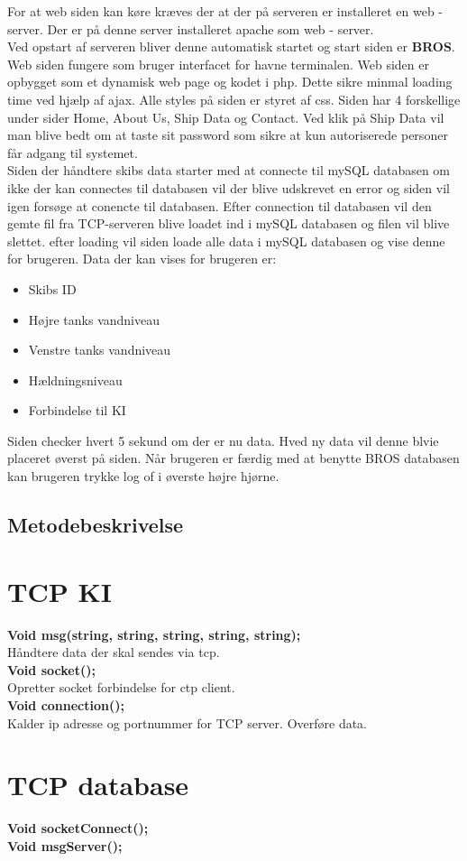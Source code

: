 For at web siden kan køre kræves der at der på serveren er installeret en web - server. Der er på denne server installeret apache som web - server.\\
Ved opstart af serveren bliver denne automatisk startet og start siden er \textbf{BROS}. Web siden fungere som bruger interfacet for havne terminalen. Web siden er opbygget som et dynamisk web page og kodet i php. Dette sikre minmal loading time ved hjælp af ajax. Alle styles på siden er styret af css. Siden har 4 forskellige under sider Home, About Us, Ship Data og Contact. Ved klik på Ship Data vil man blive bedt om at taste sit password som sikre at kun autoriserede personer får adgang til systemet.\\
Siden der håndtere skibs data starter med at connecte til mySQL databasen om ikke der kan connectes til databasen vil der blive udskrevet en error og siden vil igen forsøge at conencte til databasen. Efter connection til databasen vil den gemte fil fra TCP-serveren blive loadet ind i mySQL databasen og filen vil blive slettet. efter loading vil siden loade alle data i mySQL databasen og vise denne for brugeren. Data der kan vises for brugeren er:
\begin{itemize}
	\item Skibs ID
	\item Højre tanks vandniveau
	\item Venstre tanks vandniveau
	\item Hældningsniveau
	\item Forbindelse til KI
\end{itemize}
Siden checker hvert 5 sekund om der er nu data. Hved ny data vil denne blvie placeret øverst på siden.
Når brugeren er færdig med at benytte BROS databasen kan brugeren trykke log of i øverste højre hjørne.


\subsection{Metodebeskrivelse}
\section{TCP KI}
\textbf{Void msg(string, string, string, string, string);}\\
Håndtere data der skal sendes via tcp.\\
\textbf{Void socket();}\\
Opretter socket forbindelse for ctp client.\\
\textbf{Void connection();}\\
Kalder ip adresse og portnummer for TCP server. Overføre data.\\


\section{TCP database}
\textbf{Void socketConnect();}\\
\textbf{Void msgServer();}\\




